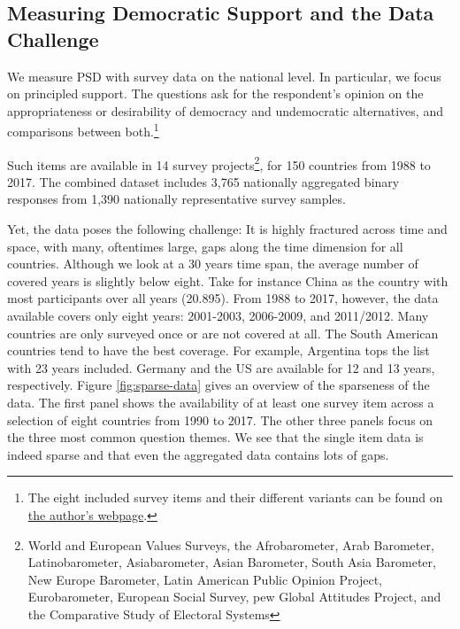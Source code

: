\documentclass[12pt,english,a4paper,oneside]{article}
\theoremstyle{definition}
\theoremstyle{definition}
\theoremstyle{definition}
\theoremstyle{definition}
\theoremstyle{remark}
\begin{document}
\hypertarget{measuring-democratic-support-and-the-data-challenge}{%
\subsection{Measuring Democratic Support and the Data Challenge}\label{measuring-democratic-support-and-the-data-challenge}}

We measure PSD with survey data on the national level. In particular, we focus on principled support. The questions ask for the respondent's opinion on the appropriateness or desirability of democracy and undemocratic alternatives, and comparisons between both.\footnote{The eight included survey items and their different variants can be found on \href{http://chrisclaassen.com/docs/Democratic_mood_supp_materials.pdf}{the author's webpage}.}

Such items are available in 14 survey projects\footnote{World and European Values Surveys, the Afrobarometer, Arab Barometer, Latinobarometer, Asiabarometer, Asian Barometer, South Asia Barometer, New Europe Barometer, Latin American Public Opinion Project, Eurobarometer, European Social Survey, pew Global Attitudes Project, and the Comparative Study of Electoral Systems}, for 150 countries from 1988 to 2017. The combined dataset includes 3,765 nationally aggregated binary responses from 1,390 nationally representative survey samples.

Yet, the data poses the following challenge: It is highly fractured across time and space, with many, oftentimes large, gaps along the time dimension for all countries. Although we look at a 30 years time span, the average number of covered years is slightly below eight. Take for instance China as the country with most participants over all years (20.895). From 1988 to 2017, however, the data available covers only eight years: 2001-2003, 2006-2009, and 2011/2012. Many countries are only surveyed once or are not covered at all. The South American countries tend to have the best coverage. For example, Argentina tops the list with 23 years included. Germany and the US are available for 12 and 13 years, respectively. Figure \ref{fig:sparse-data} gives an overview of the sparseness of the data. The first panel shows the availability of at least one survey item across a selection of eight countries from 1990 to 2017. The other three panels focus on the three most common question themes. We see that the single item data is indeed sparse and that even the aggregated data contains lots of gaps.
\end{document}
